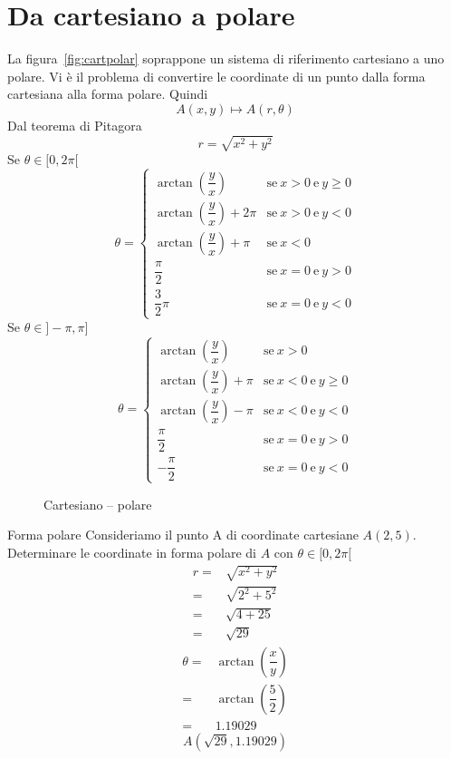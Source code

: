 \section{Da cartesiano a polare}
La figura~\vref{fig:cartpolar} soprappone un sistema di riferimento cartesiano a uno polare. Vi è il problema di convertire le coordinate di un punto dalla forma cartesiana alla forma polare. Quindi 
\[A(x,y)\mapsto A(r,\theta) \]
Dal teorema di Pitagora \[r=\sqrt{x^2+y^2} \]
Se $\theta\in[0,2\pi[$
\[\theta=\begin{cases}
\arctan(\dfrac{y}{x})&\text{se}\ x>0 \ \text{e} \ y\geq0\\[8pt]
\arctan(\dfrac{y}{x})+2\pi&\text{se}\ x>0 \ \text{e} \ y<0\\[8pt]
\arctan(\dfrac{y}{x})+\pi&\text{se}\ x<0\\[8pt]
\dfrac{\pi}{2}&\text{se}\ x=0 \ \text{e} \ y>0\\[8pt]
\dfrac{3}{2}\pi&\text{se}\ x=0 \ \text{e} \ y<0
\end{cases} 
\] 
Se $\theta\in]-\pi,\pi]$
\[\theta=\begin{cases}
\arctan(\dfrac{y}{x})&\text{se}\ x>0 \\[8pt]
\arctan(\dfrac{y}{x})+\pi&\text{se}\ x<0 \ \text{e} \ y\geq0\\[8pt]
\arctan(\dfrac{y}{x})-\pi&\text{se}\ x<0\ \text{e} \ y<0\\[8pt]
\dfrac{\pi}{2}&\text{se}\ x=0 \ \text{e} \ y>0\\[8pt]
-\dfrac{\pi}{2}&\text{se}\ x=0 \ \text{e} \ y<0
\end{cases} 
\]
\begin{figure} %
	\centering
	
	\caption{Cartesiano -- polare}\label{fig:cartpolar}
\end{figure}
\begin{esempiot}{Forma polare}{} Consideriamo il punto A di coordinate cartesiane $A(2,5)$. Determinare le coordinate in forma polare di $A$ con $\theta\in[0,2\pi[$
	\begin{align*}
	r=&\sqrt{x^2+y^2}\\
	=&\sqrt{2^2+5^2}\\
	=&\sqrt{4+25}\\
	=&\sqrt{29}
	\end{align*}
	\begin{align*}
	\theta=&\arctan\left(\dfrac{x}{y}\right)\\
		 =&\arctan\left(\dfrac{5}{2}\right)\\
	=&1.19029
	\end{align*}
	\[A(\sqrt{29},1.19029) \]
\end{esempiot}
